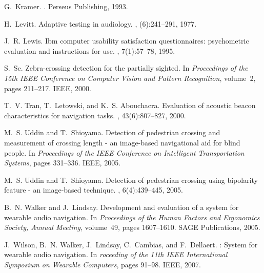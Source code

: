 \documentclass{article}
\begin{document}
\begin{thebibliography}{10}
G.~Kramer.
.
\newblock Perseus Publishing, 1993.

H.~Levitt.
\newblock Adaptive testing in audiology.
, (6):241--291, 1977.

J.~R. Lewis.
\newblock Ibm computer usability satisfaction questionnaires: psychometric
  evaluation and instructions for use.
,
  7(1):57--78, 1995.

S.~Se.
\newblock Zebra-crossing detection for the partially sighted.
\newblock In {\em Proceedings of the 15th IEEE Conference on Computer Vision
  and Pattern Recognition}, volume~2, pages 211--217. IEEE, 2000.

T.~V. Tran, T.~Letowski, and K.~S. Abouchacra.
\newblock Evaluation of acoustic beacon characteristics for navigation tasks.
, 43(6):807--827, 2000.

M.~S. Uddin and T.~Shioyama.
\newblock Detection of pedestrian crossing and measurement of crossing length -
  an image-based navigational aid for blind people.
\newblock In {\em Proceedings of the IEEE Conference on Intelligent
  Transportation Systems}, pages 331--336. IEEE, 2005.

M.~S. Uddin and T.~Shioyama.
\newblock Detection of pedestrian crossing using bipolarity feature - an
  image-based technique.
,
  6(4):439--445, 2005.

B.~N. Walker and J.~Lindsay.
\newblock Development and evaluation of a system for wearable audio navigation.
\newblock In {\em Proceedings of the Human Factors and Ergonomics Society,
  Annual Meeting}, volume~49, pages 1607--1610. SAGE Publications, 2005.

J.~Wilson, B.~N. Walker, J.~Lindsay, C.~Cambias, and F.~Dellaert.
: System for wearable audio navigation.
\newblock In {\em roceeding of the 11th IEEE International Symposium on
  Wearable Computers}, pages 91--98. IEEE, 2007.

\end{thebibliography}
\end{document}
